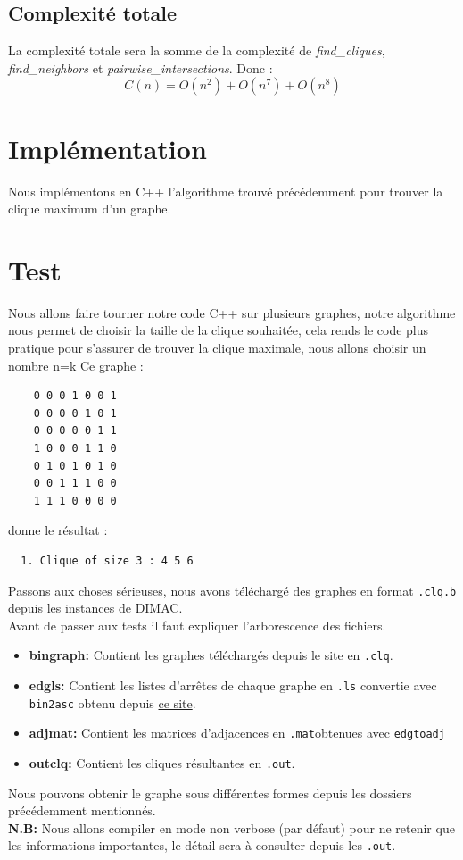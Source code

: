 \documentclass{article}
\begin{document}
\subsection{Complexité totale}
La complexité totale sera la somme de la complexité de \textit{find\_cliques}, \textit{find\_neighbors}
et \textit{pairwise\_intersections}. Donc :
\begin{displaymath}
C(n)=O(n^2)+O(n^7)+O(n^8)
\end{displaymath}

\section{Implémentation}
Nous implémentons en C++ l'algorithme trouvé précédemment pour trouver la clique
maximum d'un graphe.

\section{Test}
Nous allons faire tourner notre code C++ sur plusieurs graphes, notre algorithme
nous permet de choisir la taille de la clique souhaitée, cela rends le code plus pratique
pour s'assurer de trouver la clique maximale, nous allons choisir un nombre n=k
Ce graphe :
\begin{center}
  \begin{verbatim}
    0 0 0 1 0 0 1
    0 0 0 0 1 0 1
    0 0 0 0 0 1 1
    1 0 0 0 1 1 0
    0 1 0 1 0 1 0
    0 0 1 1 1 0 0
    1 1 1 0 0 0 0
  \end{verbatim}
\end{center}
donne le résultat :
\begin{center}
  \begin{verbatim}
  1. Clique of size 3 : 4 5 6
  \end{verbatim}
\end{center}
Passons aux choses sérieuses, nous avons téléchargé des graphes en format \texttt{.clq.b} depuis les
instances de \href{https://cse.unl.edu/~tnguyen/npbenchmarks/clique.html}{DIMAC}. \\
Avant de passer aux tests il faut expliquer l'arborescence des fichiers.
\begin{itemize}
  \item \textbf{bingraph:} Contient les graphes téléchargés depuis le site en \texttt{.clq}.
  \item \textbf{edgls:} Contient les listes d'arrêtes de chaque graphe en \texttt{.ls} convertie avec \texttt{bin2asc}
    obtenu depuis \href{https://cse.unl.edu/~tnguyen/npbenchmarks/instances/converter.tar.gz}{ce site}.
  \item \textbf{adjmat:} Contient les matrices d'adjacences en \texttt{.mat}obtenues avec \texttt{edgtoadj}
  \item \textbf{outclq:} Contient les cliques résultantes en \texttt{.out}.
\end{itemize}
Nous pouvons obtenir le graphe sous différentes formes depuis les dossiers précédemment mentionnés.\\
\textbf{N.B:} Nous allons compiler en mode non verbose (par défaut) pour ne retenir que les informations
importantes, le détail sera à consulter depuis les \texttt{.out}.
\end{document}
